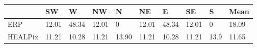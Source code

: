 \begin{tabular}{llllllllll}
\toprule
 & SW & W & NW & N & NE & E & SE & S & Mean \\
\midrule
ERP & 12.01 & 48.34 & 12.01 & 0 & 12.01 & 48.34 & 12.01 & 0 & 18.09 \\
HEALPix & 11.21 & 10.28 & 11.21 & 13.90 & 11.21 & 10.28 & 11.21 & 13.9 & 11.65 \\
\bottomrule
\end{tabular}
